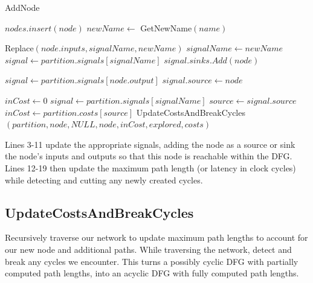 \documentclass[12pt,final,oneside]{dwThesis} %
\begin{document}
\begin{algorithm}
\begin{center}
      \end{center}

      \caption{AddNode}\label{addnode} 
      \begin{algorithmic}
         [1]
         \State $nodes.insert(node)$
           
         \State
         $newName \gets$ GetNewName$(name)$ 

         \State Replace$(node.inputs, signalName, newName)$  
         \State $signalName
         \gets newName$ \EndIf 
         \State $signal \gets
         partition.signals[signalName]$ 
         \State $signal.sinks.Add(node)$ \EndFor

         \State $signal \gets partition.signals[node.output]$ 
         \State
         $signal.source \gets node$


         \State $inCost \gets 0$  
         \State
         $signal \gets partition.signals[signalName]$ 
         \State $source \gets
         signal.source$  
         \State $inCost
         \gets partition.costs[source]$ \EndIf \EndFor 
         \State
         UpdateCostsAndBreakCycles$(partition, node, NULL, node, inCost,
         explored, costs)$ \EndProcedure 
      \end{algorithmic}

   \end{algorithm}

   Lines 3-11 update the appropriate signals, adding the node as a source or
   sink the node's inputs and outputs so that this node is reachable within the
   \gls{DFG}.  Lines 12-19 then update the maximum path length (or latency in
   clock cycles) while detecting and cutting any newly created cycles.


   \newpage 
   \subsection{UpdateCostsAndBreakCycles}
   Recursively traverse our
   network to update maximum path lengths to account for our new node and
   additional paths. While traversing the network, detect and break any cycles
   we encounter.  This turns a possibly cyclic \gls{DFG} with partially
   computed path lengths, into an acyclic \gls{DFG} with fully computed path
   lengths.
\end{document}
